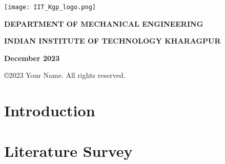 \documentclass[a4paper,twoside,12pt]{article}
\begin{document}
	\vspace{2em}
	\begin{center}
		\texttt{[image: IIT\_Kgp\_logo.png]}
	\end{center}
	\vspace{1em}
	\begin{center}
		\textbf{DEPARTMENT OF MECHANICAL ENGINEERING}
	\end{center}
	\vspace{-2em}
	\begin{center}
		\textbf{INDIAN INSTITUTE OF TECHNOLOGY KHARAGPUR}
	\end{center}
	\vspace{-1em}
	\begin{center}
		\textbf{December 2023}
	\end{center}
	\vspace{-2em}
	\begin{center}
		\copyright 2023 Your Name. All rights reserved.
	\end{center}
	\newpage
	\thispagestyle{empty}
	\cleardoublepage



\title{}
\author{}
\date{}
\maketitle
\vspace{-3.5cm}
\tableofcontents
	\newpage
\thispagestyle{empty}
\cleardoublepage
%



\newpage
\section{Introduction}


\section{Literature Survey}
\end{document}

